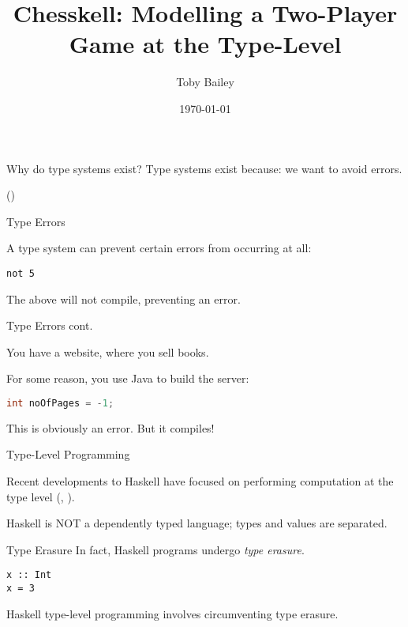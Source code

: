 \documentclass{beamer}
\title{Chesskell: Modelling a Two-Player Game at the Type-Level}
\author{Toby Bailey}
\institute{Department of Computer Science}
\date{\today}
\begin{document}
\frame{\titlepage}

\begin{frame}{Why do type systems exist?}
Type systems exist because: \pause we want to avoid errors.

(\cite{cardellitypes})


\end{frame}

\begin{frame}[fragile]{Type Errors}

A type system can prevent certain errors from occurring at all:

\begin{lstlisting}
not 5
\end{lstlisting}

The above will not compile, preventing an error.
    
\end{frame}

\begin{frame}[fragile]{Type Errors cont.}

You have a website, where you sell books.

\pause

For some reason, you use Java to build the server:

\begin{lstlisting}[language=Java]
int noOfPages = -1;
\end{lstlisting}

This is obviously an error. But it compiles!
    
\end{frame}

\begin{frame}[fragile]{Type-Level Programming}

Recent developments to Haskell have focused on performing computation at the type level (\cite{opentfs}, \cite{closedtfs}).

Haskell is NOT a dependently typed language; types and values are separated.
    
\end{frame}

\begin{frame}[fragile]{Type Erasure}
In fact, Haskell programs undergo \emph{type erasure}.

\pause

\begin{lstlisting}
x :: Int
x = 3
\end{lstlisting}

Haskell type-level programming involves circumventing type erasure.

\end{frame}
\end{document}

